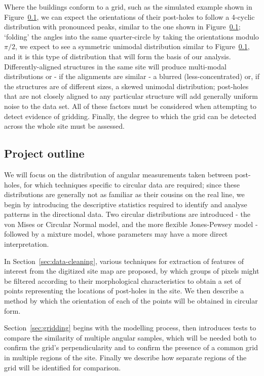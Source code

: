 \documentclass[../../ArchStats.tex]{subfiles}
\begin{document}
Where the buildings conform to a grid, such as the simulated example shown in Figure~\ref{}, we can expect the orientations of their post-holes to follow a 4-cyclic distribution with pronounced peaks, similar to the one shown in Figure~\ref{}; `folding' the angles into the same quarter-circle by taking the orientations modulo $\pi/2$, we expect to see a symmetric unimodal distribution similar to Figure~\ref{}, and it is this type of distribution that will form the basis of our analysis. Differently-aligned structures in the same site will produce multi-modal distributions or - if the alignments are similar - a blurred (less-concentrated) or, if the structures are of different sizes, a skewed unimodal distribution;  post-holes that are not closely aligned  to any particular structure will add generally uniform noise to the data set. All of these factors must be considered when attempting to detect evidence of gridding. Finally, the degree to which the grid can be detected across the whole site must be assessed.




\subsection{Project outline}
We will focus on the distribution of angular measurements taken between post-holes, for which techniques specific to circular data are required; since these distributions are generally not as familiar as their cousins on the real line, we begin by introducing the descriptive statistics required to identify and analyse patterns in the directional data. Two circular distributions are introduced - the von Mises or Circular Normal model, and the more flexible Jones-Pewsey model - followed by a mixture model, whose parameters may have a more direct interpretation.

In Section~\ref{sec:data-cleaning}, various techniques for extraction of features of interest from the digitized site map are proposed, by which groups of pixels might be filtered according to their morphological characteristics to obtain a set of points representing the locations of post-holes in the site. We then describe a method by which the orientation of each of the points will be obtained in circular form.

Section~\ref{sec:gridding} begins with the modelling process, then introduces tests to compare the similarity of multiple angular samples, which will be needed both to confirm the grid's perpendicularity and to confirm the presence of a common grid in multiple regions of the site. Finally we describe how separate regions of the grid will be identified for comparison.
\end{document}
